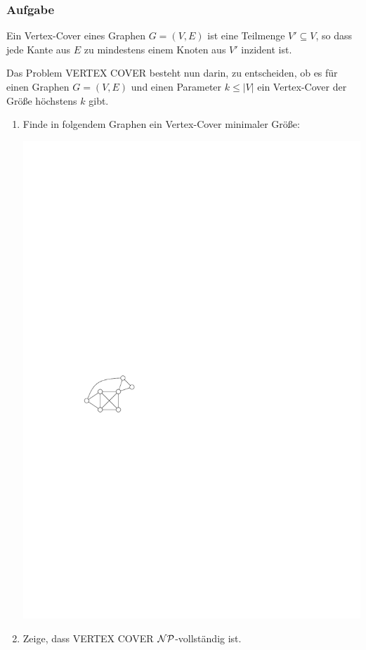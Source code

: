 \begin{frame}
\frametitle{Aufgabe}
Ein Vertex-Cover eines Graphen $G=(V,E)$ ist eine Teilmenge $V'\subseteq V$, so
dass jede Kante aus $E$ zu mindestens einem Knoten aus $V'$ inzident ist.

Das Problem \textsc{VERTEX COVER} besteht nun darin, zu entscheiden, ob es
für einen Graphen $G=(V,E)$ und einen Parameter $k \leq |V|$ ein Vertex-Cover
der Größe höchstens $k$ gibt.

\begin{enumerate}
	\item Finde in folgendem Graphen ein Vertex-Cover minimaler Größe: 
	
		\begin{center}\includegraphics[scale=1.2]{images/tut7-graph}\end{center}
		
	\item Zeige, dass \textsc{VERTEX COVER} $\cal{NP}$-vollständig ist. 
\end{enumerate}
\end{frame}

